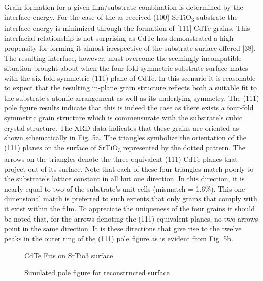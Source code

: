Grain formation for a given film/substrate combination is
determined by the interface energy. For the case of the as-received
(100) SrTiO\textsubscript{3} substrate the interface energy is minimized through
the formation of [111] CdTe grains. This interfacial relationship is
not surprising as CdTe has demonstrated a high propensity for
forming it almost irrespective of the substrate surface offered [38].
The resulting interface, however, must overcome the seemingly
incompatible situation brought about when the four-fold symmetric substrate surface mates with the six-fold symmetric (111)
plane of CdTe. In this scenario it is reasonable to expect that the
resulting in-plane grain structure reflects both a suitable fit to the
substrate’s atomic arrangement as well as its underlying symmetry. The (111) pole figure results indicate that this is indeed the
case as there exists a four-fold symmetric grain structure which is
commensurate with the substrate’s cubic crystal structure. The
XRD data indicates that these grains are oriented as shown
schematically in Fig. 5a. The triangles symbolize the orientation of
the (111) planes on the surface of SrTiO\textsubscript{3} represented by the
dotted pattern. The arrows on the triangles denote the three
equivalent (111) CdTe planes that project out of its surface. Note
that each of these four triangles match poorly to the substrate’s
lattice constant in all but one direction. In this direction, it is nearly
equal to two of the substrate’s unit cells (mismatch = 1.6\%). This
one-dimensional match is preferred to such extents that only
grains that comply with it exist within the film. To appreciate the
uniqueness of the four grains it should be noted that, for the arrows
denoting the (111) equivalent planes, no two arrows point in the
same direction. It is these directions that give rise to the twelve
peaks in the outer ring of the (111) pole figure as is evident from
Fig. 5b.
\begin{figure}
    \centering
    \caption{\label{fig:srtio3_tri_on_100}CdTe Fits on SrTio3 surface}
\end{figure}
\begin{figure}
    \centering
    \caption{\label{fig:srtio3_sim_polefigure} Simulated pole figure for reconstructed surface}
\end{figure}

